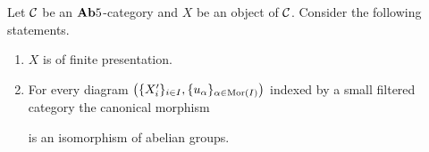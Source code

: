 \begin{theorem}\label{theorem:finitelypresentedandfilteredcolimits}
Let ${\mathcal C}$ be an $\mathbf{Ab}5$-category and $X$ be an object of ${\mathcal C}$. Consider the following statements.
\begin{enumerate}[label=\emph{\textbf{(\roman*)}}, leftmargin=1.5em]
\item $X$ is of finite presentation.
\item For every diagram $\left(\{X'_i\}_{i\in I},\{u_{\alpha}\}_{\alpha \in \mathrm{Mor}(I)}\right)$ indexed by a small filtered category the canonical morphism
\begin{center}
\end{center}
is an isomorphism of abelian groups.
\end{enumerate} 
\end{theorem}
